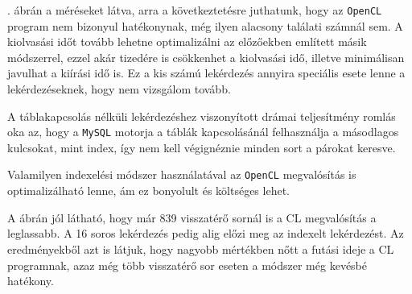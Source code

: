 . ábrán a méréseket látva, arra a következtetésre juthatunk, hogy az \texttt{OpenCL} program nem bizonyul hatékonynak, még ilyen alacsony találati számnál sem. A kiolvasási időt tovább lehetne optimalizálni az előzőekben említett másik módszerrel, ezzel akár tizedére is csökkenhet a kiolvasási idő, illetve minimálisan javulhat a kiírási idő is. Ez a kis számú lekérdezés annyira speciális esete lenne a lekérdezéseknek, hogy nem vizsgálom tovább.

A táblakapcsolás nélküli lekérdezéshez viszonyított drámai teljesítmény romlás oka az, hogy a \texttt{MySQL} motorja a táblák kapcsolásánál felhasználja a másodlagos kulcsokat, mint index, így nem kell végignéznie minden sort a párokat keresve.

Valamilyen indexelési módszer használatával az \texttt{OpenCL} megvalósítás is optimalizálható lenne, ám ez bonyolult és költséges lehet.

A  ábrán jól látható, hogy már 839 visszatérő sornál is a CL megvalósítás a leglassabb. A 16 soros lekérdezés pedig alig előzi meg az indexelt lekérdezést.
Az eredményekből azt is látjuk, hogy nagyobb mértékben nőtt a futási ideje a CL programnak, azaz még több visszatérő sor eseten a módszer még kevésbé hatékony.
